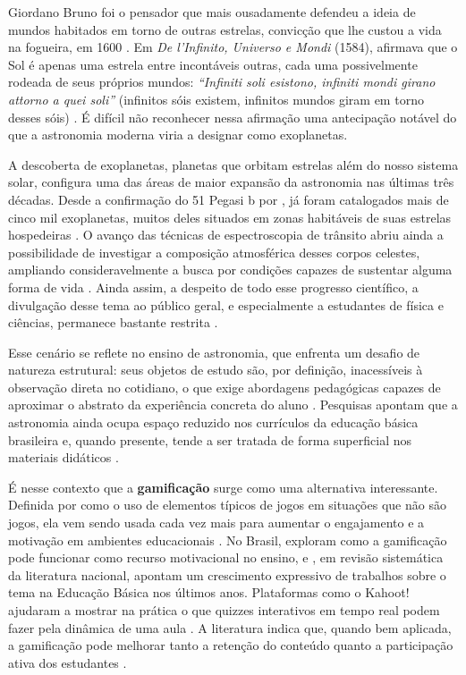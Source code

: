 \documentclass[
	12pt,
	openany,
	oneside,
	a4paper,
	english,
	brazil
]{abntex2}
\begin{document}
Giordano Bruno foi o pensador que mais ousadamente defendeu a ideia de mundos habitados em torno de outras estrelas, convicção que lhe custou a vida na fogueira, em 1600 \cite{singer1950}. Em \textit{De l'Infinito, Universo e Mondi} (1584), afirmava que o Sol é apenas uma estrela entre incontáveis outras, cada uma possivelmente rodeada de seus próprios mundos: \textit{``Infiniti soli esistono, infiniti mondi girano attorno a quei soli''} (infinitos sóis existem, infinitos mundos giram em torno desses sóis) \cite{bruno1584}. É difícil não reconhecer nessa afirmação uma antecipação notável do que a astronomia moderna viria a designar como exoplanetas.

A descoberta de exoplanetas, planetas que orbitam estrelas além do nosso sistema solar, configura uma das áreas de maior expansão da astronomia nas últimas três décadas. Desde a confirmação do 51 Pegasi b por , já foram catalogados mais de cinco mil exoplanetas, muitos deles situados em zonas habitáveis de suas estrelas hospedeiras \cite{nasaexoplanet2024}. O avanço das técnicas de espectroscopia de trânsito abriu ainda a possibilidade de investigar a composição atmosférica desses corpos celestes, ampliando consideravelmente a busca por condições capazes de sustentar alguma forma de vida \cite{seager2010}. Ainda assim, a despeito de todo esse progresso científico, a divulgação desse tema ao público geral, e especialmente a estudantes de física e ciências, permanece bastante restrita \cite{langhi2009}.

Esse cenário se reflete no ensino de astronomia, que enfrenta um desafio de natureza estrutural: seus objetos de estudo são, por definição, inacessíveis à observação direta no cotidiano, o que exige abordagens pedagógicas capazes de aproximar o abstrato da experiência concreta do aluno \cite{nardi2005, langhi2009tese}. Pesquisas apontam que a astronomia ainda ocupa espaço reduzido nos currículos da educação básica brasileira e, quando presente, tende a ser tratada de forma superficial nos materiais didáticos \cite{langhi2009, bretones1999}.

É nesse contexto que a \textbf{gamificação} surge como uma alternativa interessante. Definida por  como o uso de elementos típicos de jogos em situações que não são jogos, ela vem sendo usada cada vez mais para aumentar o engajamento e a motivação em ambientes educacionais \cite{vianna2013, alves2015, tolomei2017}. No Brasil,  exploram como a gamificação pode funcionar como recurso motivacional no ensino, e , em revisão sistemática da literatura nacional, apontam um crescimento expressivo de trabalhos sobre o tema na Educação Básica nos últimos anos. Plataformas como o Kahoot! ajudaram a mostrar na prática o que quizzes interativos em tempo real podem fazer pela dinâmica de uma aula \cite{wang2020kahoot, licorish2018}. A literatura indica que, quando bem aplicada, a gamificação pode melhorar tanto a retenção do conteúdo quanto a participação ativa dos estudantes \cite{fadel2014, sailer2017}.
\end{document}
